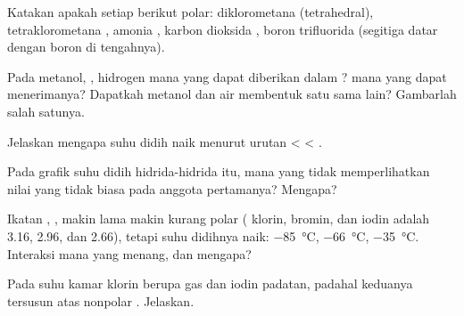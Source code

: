 \begin{exercise}[$\star\star$]\label{exo:g11:polarity-and-cohesion:6}
Katakan apakah setiap  berikut polar: diklorometana 
(tetrahedral), tetraklorometana , amonia , karbon
dioksida , boron trifluorida  (segitiga datar dengan
boron di tengahnya).
\end{exercise}

\begin{exercise}[$\star\star$]\label{exo:g11:polarity-and-cohesion:7}
Pada metanol, ,  hidrogen mana yang dapat diberikan dalam
?  mana yang dapat menerimanya? Dapatkah 
metanol dan  air membentuk  satu sama lain?
Gambarlah salah satunya.
\end{exercise}

\begin{exercise}[$\star\star$]\label{exo:g11:polarity-and-cohesion:8}
Jelaskan mengapa suhu didih naik menurut urutan  <
 < .
\end{exercise}

\begin{exercise}[$\star\star$]\label{exo:g11:polarity-and-cohesion:9}
Pada grafik suhu didih hidrida-hidrida itu,  mana yang tidak
memperlihatkan nilai yang tidak biasa pada anggota pertamanya? Mengapa?
\end{exercise}

\begin{exercise}[$\star\star$]\label{exo:g11:polarity-and-cohesion:10}
Ikatan , ,  makin lama makin kurang polar
( klorin, bromin, dan iodin adalah 3.16, 2.96, dan
2.66), tetapi suhu didihnya naik: \qty{-85}{\celsius},
\qty{-66}{\celsius}, \qty{-35}{\celsius}. Interaksi mana yang menang, dan
mengapa?
\end{exercise}

\begin{exercise}[$\star\star$]\label{exo:g11:polarity-and-cohesion:11}
Pada suhu kamar klorin berupa gas dan iodin padatan, padahal keduanya
tersusun atas  nonpolar . Jelaskan.
\end{exercise}

